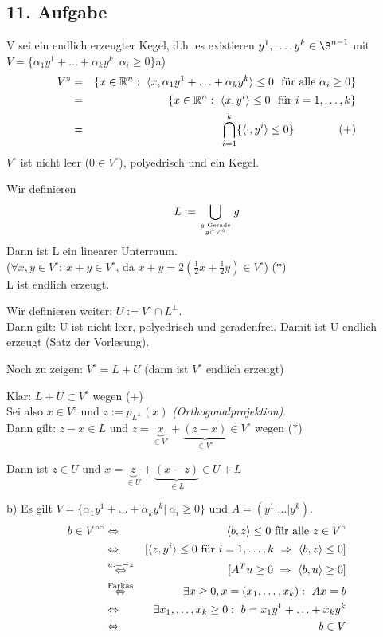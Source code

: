\documentclass[a4paper,11pt,twoside,titlepage]{article}
\newcommand{\R}{{\mathbb R}}
\begin{document}
\subsection*{11. Aufgabe}
V sei ein endlich erzeugter Kegel, d.h. es existieren $y^1,\ldots,y^k\in\S^{n-1}$ mit $V=\{\alpha_1y^1+\ldots+\alpha_ky^k|\:\alpha_i\geq 0\}$\newline
[$S^{n-1}=\{u\in\R^n:\ \|u\|=1\}$ Einheitssphäre]
a) \begin{eqnarray*}
V^\circ&=&\{x\in\R^n:\ \langle x,\alpha_1y^1+\ldots+\alpha_ky^k\rangle\leq0\ \textnormal{ für alle }\alpha_i\geq0\}\\
&=&\{x\in\R^n:\ \langle x,y^i\rangle\leq 0\ \textnormal{ für }i=1,\ldots,k\}\\
&=&\bigcap_{i=1}^k\{\langle\cdot,y^i\rangle\leq0\}\qquad\qquad(+)
\end{eqnarray*}
$V^\circ$ ist nicht leer ($0\in V^\circ$), polyedrisch und ein Kegel.

Wir definieren
\[L:=\bigcup_{g \textnormal{ Gerade}\atop g\subset V^\circ}g\]
Dann ist L ein linearer Unterraum.\\
($\forall x,y\in V^\circ:\ x+y\in V^\circ$, da $x+y=2(\frac{1}{2}x+\frac{1}{2}y)\in V^\circ$) ($\ast$)\\
L ist endlich erzeugt.

Wir definieren weiter: $U:=V^\circ\cap L^\bot$.\\
Dann gilt: U ist nicht leer, polyedrisch und geradenfrei. Damit ist U endlich erzeugt (Satz der Vorlesung).

Noch zu zeigen: $V^\circ=L+U$ (dann ist $V^\circ$ endlich erzeugt)

Klar: $L+U\subset V^\circ$ wegen (+)\\
Sei also $x\in V^\circ$ und $z:=p_{L^\bot}(x)$ \textit{(Orthogonalprojektion)}.\\
Dann gilt: $z-x\in L$ und $z=\underbrace{x}_{\in V^\circ}+\underbrace{(z-x)}_{\in V^\circ}\in V^\circ$ wegen ($\ast$)

Dann ist $z\in U$ und $x=\underbrace{z}_{\in U}+\underbrace{(x-z)}_{\in L}\in U+L$

b) Es gilt $V=\{\alpha_1y^1+\ldots+\alpha_ky^k|\:\alpha_i\geq 0\}$ und $A=(y^1|\ldots|y^k)$.
\begin{eqnarray*}
b\in V^{\circ\circ}&\Leftrightarrow&\langle b,z\rangle\leq 0 \textnormal{ für alle \ensuremath{z\in V^\circ}}\\
&\Leftrightarrow&[\langle z,y^i\rangle\leq 0 \textnormal{ für } i=1,\ldots,k\ \Rightarrow\ \langle b,z\rangle\leq 0 ]\\
&\stackrel{u:=-z}{\Leftrightarrow}&[A^Tu\geq0\ \Rightarrow\ \langle b,u\rangle\geq 0]\\
&\stackrel{\textnormal{\scriptsize{Farkas}}}{\Leftrightarrow}&\exists x\geq0, x=(x_1,\ldots,x_k):\ Ax=b\\
&\Leftrightarrow&\exists x_1,\ldots,x_k\geq0:\ b=x_1y^1+\ldots+x_ky^k\\
&\Leftrightarrow&b\in V
\end{eqnarray*}
\end{document}
